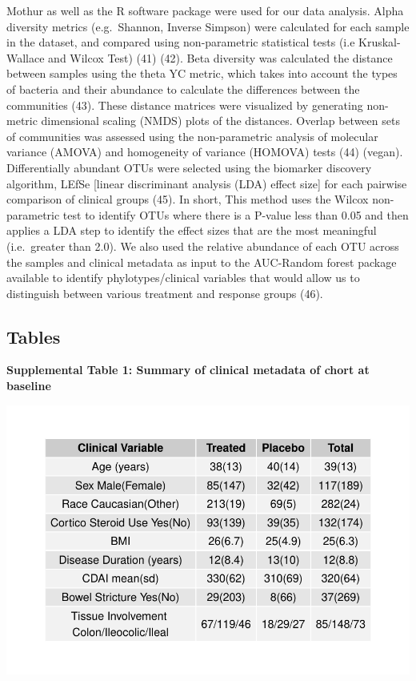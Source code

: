 \documentclass[11pt,]{article}
\begin{document}
Mothur as well as the R software package were used for our data
analysis. Alpha diversity metrics (e.g.~Shannon, Inverse Simpson) were
calculated for each sample in the dataset, and compared using
non-parametric statistical tests (i.e Kruskal-Wallace and Wilcox Test)
(41) (42). Beta diversity was calculated the distance between samples
using the theta YC metric, which takes into account the types of
bacteria and their abundance to calculate the differences between the
communities (43). These distance matrices were visualized by generating
non-metric dimensional scaling (NMDS) plots of the distances. Overlap
between sets of communities was assessed using the non-parametric
analysis of molecular variance (AMOVA) and homogeneity of variance
(HOMOVA) tests (44) (vegan). Differentially abundant OTUs were selected
using the biomarker discovery algorithm, LEfSe {[}linear discriminant
analysis (LDA) effect size{]} for each pairwise comparison of clinical
groups (45). In short, This method uses the Wilcox non-parametric test
to identify OTUs where there is a P-value less than 0.05 and then
applies a LDA step to identify the effect sizes that are the most
meaningful (i.e.~greater than 2.0). We also used the relative abundance
of each OTU across the samples and clinical metadata as input to the
AUC-Random forest package available to identify phylotypes/clinical
variables that would allow us to distinguish between various treatment
and response groups (46).

\newpage

\subsection{Tables}\label{tables}

\textbf{Supplemental Table 1: Summary of clinical metadata of chort at
baseline}

\includegraphics{tables/SupTable1_baseline_metadata.pdf}
\end{document}
